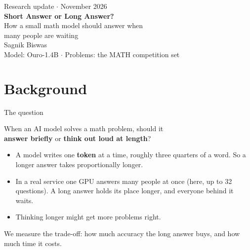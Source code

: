 \documentclass[aspectratio=169,11pt]{beamer}
\newcommand{\takeaway}[1]{\par\vfill\begin{center}\colorbox{accent!8}{\parbox{0.9\textwidth}{\centering\small #1}}\end{center}\vspace{0.2em}}
\begin{document}
\begin{frame}[plain]
  \vspace{2.2em}
  \begin{center}
  {\color{muted}\small Research update \;$\cdot$\; November 2026}\\[1.1em]
  {\LARGE\bfseries Short Answer or Long Answer?}\\[0.5em]
  {\large How a small math model should answer when\\many people are waiting}\\[1.6em]
  {\normalsize Sagnik Biswas}\\[2.2em]
  {\color{muted}\footnotesize Model: Ouro-1.4B \;$\cdot$\; Problems: the MATH competition set}
  \end{center}
\end{frame}

\section{Background}

\begin{frame}{The question}
  \vspace{0.4em}
  \begin{center}
  {\large When an AI model solves a math problem, should it\\[0.2em]
  \textbf{answer briefly} or \textbf{think out loud at length}?}
  \end{center}
  \vspace{0.5em}
  \begin{itemize}\setlength\itemsep{0.45em}
    \item A model writes one \textbf{token} at a time, roughly three quarters of a word.
      So a longer answer takes proportionally longer.
    \item In a real service one GPU answers many people at once (here, up to 32 questions).
      A long answer holds its place longer, and everyone behind it waits.
    \item Thinking longer might get more problems right.
  \end{itemize}
  \takeaway{We measure the trade-off: how much accuracy the long answer buys, and how much time it costs.}
\end{frame}
\end{document}
